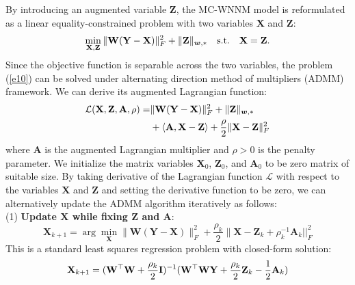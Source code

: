 \documentclass[10pt,twocolumn,letterpaper,sort&compress]{article}
\begin{document}
By introducing an augmented variable $\mathbf{Z}$, the MC-WNNM model is reformulated as a linear equality-constrained problem with two variables $\mathbf{X}$ and $\mathbf{Z}$:
\vspace{-1mm}
\begin{equation}
\label{e10}
\vspace{-1mm}
\min_{\mathbf{X},\mathbf{Z}}\|\mathbf{W}(\mathbf{Y}-\mathbf{X})\|_{F}^{2}
+
\|\mathbf{Z}\|_{\bm{w},*}
\quad
\text{s.t.}
\quad
\mathbf{X}=\mathbf{Z}.
\end{equation}
Since the objective function is separable across the two variables, the problem (\ref{e10}) can be solved under alternating direction method of multipliers (ADMM) framework. We can derive its augmented Lagrangian function:
\vspace{-1mm}
\begin{equation}
\label{e11}
\vspace{-1mm}
\begin{split}
\mathcal{L}(\mathbf{X},\mathbf{Z},\mathbf{A},\rho)
=
&\|\mathbf{W}(\mathbf{Y}-\mathbf{X})\|_{F}^{2}
+
\|\mathbf{Z}\|_{\bm{w},*}
\\
&
+
\langle
\mathbf{A},\mathbf{X}-\mathbf{Z}
\rangle
+
\frac{\rho}{2}
\|\mathbf{X}-\mathbf{Z}\|_{F}^{2}
\end{split}
\end{equation}
where $\mathbf{A}$ is the augmented Lagrangian multiplier and $\rho>0$ is the penalty parameter. We initialize the matrix variables $\mathbf{X}_{0}$, $\mathbf{Z}_{0}$, and $\mathbf{A}_{0}$ to be zero matrix of suitable size. By taking derivative of the Lagrangian function $\mathcal{L}$ with respect to the variables $\mathbf{X}$ and $\mathbf{Z}$ and setting the derivative function to be zero, we can alternatively update the ADMM algorithm iteratively as follows:
\\
(1) \textbf{Update $\mathbf{X}$ while fixing $\mathbf{Z}$ and $\mathbf{A}$}:
\vspace{-1mm}
\begin{equation}
\label{e12}
\mathbf{X}_{k+1}
=
\arg\min_{\mathbf{X}}
\|\mathbf{W}(\mathbf{Y}-\mathbf{X})\|_{F}^{2} 
+
\frac{\rho_{k}}{2}\|\mathbf{X} - \mathbf{Z}_{k} + \rho_{k}^{-1}\mathbf{A}_{k}||_{F}^{2}
\end{equation}
This is a standard least squares regression problem with closed-form solution:
\vspace{-1mm}
\begin{equation}
\label{e13}
\vspace{-1mm}
\mathbf{X}_{k+1}
=
(\mathbf{W}^{\top}\mathbf{W}+\frac{\rho_{k}}{2}\mathbf{I})^{-1}
(\mathbf{W}^{\top}\mathbf{W}\mathbf{Y} + \frac{\rho_{k}}{2}\mathbf{Z}_{k} -\frac{1}{2}\mathbf{A}_{k})
\end{equation}
\end{document}
